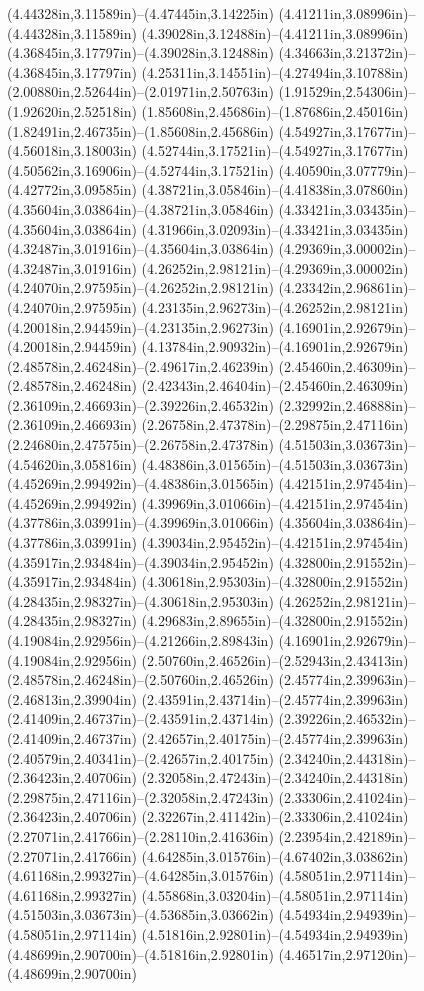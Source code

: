 (4.44328in,3.11589in)--(4.47445in,3.14225in) (4.41211in,3.08996in)--(4.44328in,3.11589in) (4.39028in,3.12488in)--(4.41211in,3.08996in) (4.36845in,3.17797in)--(4.39028in,3.12488in) (4.34663in,3.21372in)--(4.36845in,3.17797in) (4.25311in,3.14551in)--(4.27494in,3.10788in) (2.00880in,2.52644in)--(2.01971in,2.50763in) (1.91529in,2.54306in)--(1.92620in,2.52518in) (1.85608in,2.45686in)--(1.87686in,2.45016in) (1.82491in,2.46735in)--(1.85608in,2.45686in) (4.54927in,3.17677in)--(4.56018in,3.18003in) (4.52744in,3.17521in)--(4.54927in,3.17677in) (4.50562in,3.16906in)--(4.52744in,3.17521in) (4.40590in,3.07779in)--(4.42772in,3.09585in) (4.38721in,3.05846in)--(4.41838in,3.07860in) (4.35604in,3.03864in)--(4.38721in,3.05846in) (4.33421in,3.03435in)--(4.35604in,3.03864in) (4.31966in,3.02093in)--(4.33421in,3.03435in) (4.32487in,3.01916in)--(4.35604in,3.03864in) (4.29369in,3.00002in)--(4.32487in,3.01916in) (4.26252in,2.98121in)--(4.29369in,3.00002in) (4.24070in,2.97595in)--(4.26252in,2.98121in) (4.23342in,2.96861in)--(4.24070in,2.97595in) (4.23135in,2.96273in)--(4.26252in,2.98121in) (4.20018in,2.94459in)--(4.23135in,2.96273in) (4.16901in,2.92679in)--(4.20018in,2.94459in) (4.13784in,2.90932in)--(4.16901in,2.92679in) (2.48578in,2.46248in)--(2.49617in,2.46239in) (2.45460in,2.46309in)--(2.48578in,2.46248in) (2.42343in,2.46404in)--(2.45460in,2.46309in) (2.36109in,2.46693in)--(2.39226in,2.46532in) (2.32992in,2.46888in)--(2.36109in,2.46693in) (2.26758in,2.47378in)--(2.29875in,2.47116in) (2.24680in,2.47575in)--(2.26758in,2.47378in) (4.51503in,3.03673in)--(4.54620in,3.05816in) (4.48386in,3.01565in)--(4.51503in,3.03673in) (4.45269in,2.99492in)--(4.48386in,3.01565in) (4.42151in,2.97454in)--(4.45269in,2.99492in) (4.39969in,3.01066in)--(4.42151in,2.97454in) (4.37786in,3.03991in)--(4.39969in,3.01066in) (4.35604in,3.03864in)--(4.37786in,3.03991in) (4.39034in,2.95452in)--(4.42151in,2.97454in) (4.35917in,2.93484in)--(4.39034in,2.95452in) (4.32800in,2.91552in)--(4.35917in,2.93484in) (4.30618in,2.95303in)--(4.32800in,2.91552in) (4.28435in,2.98327in)--(4.30618in,2.95303in) (4.26252in,2.98121in)--(4.28435in,2.98327in) (4.29683in,2.89655in)--(4.32800in,2.91552in) (4.19084in,2.92956in)--(4.21266in,2.89843in) (4.16901in,2.92679in)--(4.19084in,2.92956in) (2.50760in,2.46526in)--(2.52943in,2.43413in) (2.48578in,2.46248in)--(2.50760in,2.46526in) (2.45774in,2.39963in)--(2.46813in,2.39904in) (2.43591in,2.43714in)--(2.45774in,2.39963in) (2.41409in,2.46737in)--(2.43591in,2.43714in) (2.39226in,2.46532in)--(2.41409in,2.46737in) (2.42657in,2.40175in)--(2.45774in,2.39963in) (2.40579in,2.40341in)--(2.42657in,2.40175in) (2.34240in,2.44318in)--(2.36423in,2.40706in) (2.32058in,2.47243in)--(2.34240in,2.44318in) (2.29875in,2.47116in)--(2.32058in,2.47243in) (2.33306in,2.41024in)--(2.36423in,2.40706in) (2.32267in,2.41142in)--(2.33306in,2.41024in) (2.27071in,2.41766in)--(2.28110in,2.41636in) (2.23954in,2.42189in)--(2.27071in,2.41766in) (4.64285in,3.01576in)--(4.67402in,3.03862in) (4.61168in,2.99327in)--(4.64285in,3.01576in) (4.58051in,2.97114in)--(4.61168in,2.99327in) (4.55868in,3.03204in)--(4.58051in,2.97114in) (4.51503in,3.03673in)--(4.53685in,3.03662in) (4.54934in,2.94939in)--(4.58051in,2.97114in) (4.51816in,2.92801in)--(4.54934in,2.94939in) (4.48699in,2.90700in)--(4.51816in,2.92801in) (4.46517in,2.97120in)--(4.48699in,2.90700in) 